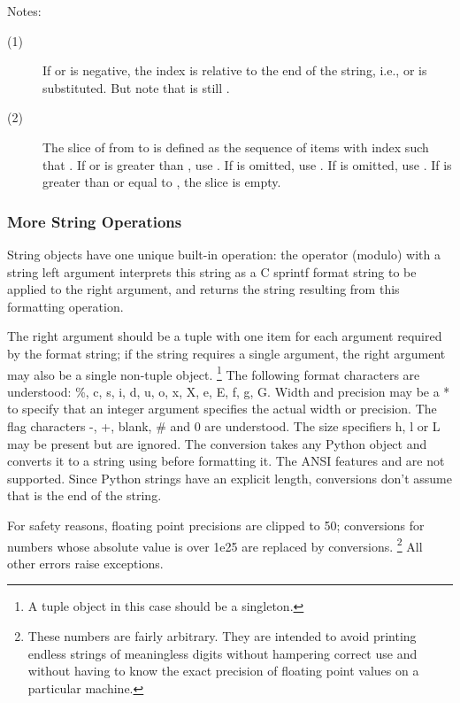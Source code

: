 \noindent
Notes:

\begin{description}
  
\item[(1)] If  or  is negative, the index is relative to
  the end of the string, i.e.,  or
   is substituted.  But note that  is
  still .
  
\item[(2)] The slice of  from  to  is defined as
  the sequence of items with index  such that .  If  or  is greater than
  , use .  If  is omitted,
  use .  If  is omitted, use .  If
   is greater than or equal to , the slice is empty.

\end{description}

\subsubsection{More String Operations}

String objects have one unique built-in operation: the \code{\%}
operator (modulo) with a string left argument interprets this string
as a C sprintf format string to be applied to the right argument, and
returns the string resulting from this formatting operation.

The right argument should be a tuple with one item for each argument
required by the format string; if the string requires a single
argument, the right argument may also be a single non-tuple object.%
\footnote{A tuple object in this case should be a singleton.}
The following format characters are understood:
\%, c, s, i, d, u, o, x, X, e, E, f, g, G.
Width and precision may be a * to specify that an integer argument
specifies the actual width or precision.  The flag characters -, +,
blank, \# and 0 are understood.  The size specifiers h, l or L may be
present but are ignored.  The  conversion takes any Python
object and converts it to a string using  before
formatting it.  The ANSI features  and 
are not supported.  Since Python strings have an explicit length,
 conversions don't assume that  is the end of
the string.

For safety reasons, floating point precisions are clipped to 50;
 conversions for numbers whose absolute value is over 1e25
are replaced by  conversions.%
\footnote{These numbers are fairly arbitrary.  They are intended to
avoid printing endless strings of meaningless digits without hampering
correct use and without having to know the exact precision of floating
point values on a particular machine.}
All other errors raise exceptions.

